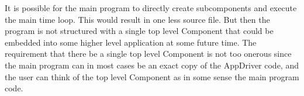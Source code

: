 %


It is possible for the main program to directly
create subcomponents and execute the main time loop.
This would result in one less source file.  But then the program
is not structured with a single top level Component that could be
embedded into some higher level application at some future time.
The requirement that there be a single top level Component is not 
too onerous since the main program can in most cases be an exact 
copy of the AppDriver code, and the user can think of the top
level Component as in some sense the main program code.

